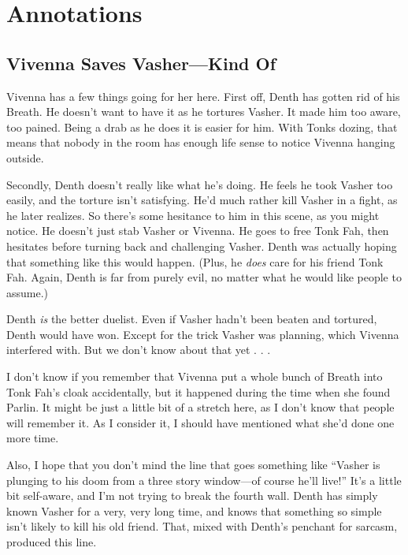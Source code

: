 \section*{Annotations}

\subsection*{Vivenna Saves Vasher—Kind Of}

Vivenna has a few things going for her here. First off, Denth has gotten rid of his Breath. He doesn’t want to have it as he tortures Vasher. It made him too aware, too pained. Being a drab as he does it is easier for him. With Tonks dozing, that means that nobody in the room has enough life sense to notice Vivenna hanging outside.

Secondly, Denth doesn’t really like what he’s doing. He feels he took Vasher too easily, and the torture isn’t satisfying. He’d much rather kill Vasher in a fight, as he later realizes. So there’s some hesitance to him in this scene, as you might notice. He doesn’t just stab Vasher or Vivenna. He goes to free Tonk Fah, then hesitates before turning back and challenging Vasher. Denth was actually hoping that something like this would happen. (Plus, he \textit{does} care for his friend Tonk Fah. Again, Denth is far from purely evil, no matter what he would like people to assume.)

Denth \textit{is} the better duelist. Even if Vasher hadn’t been beaten and tortured, Denth would have won. Except for the trick Vasher was planning, which Vivenna interfered with. But we don’t know about that yet . . .

I don’t know if you remember that Vivenna put a whole bunch of Breath into Tonk Fah’s cloak accidentally, but it happened during the time when she found Parlin. It might be just a little bit of a stretch here, as I don’t know that people will remember it. As I consider it, I should have mentioned what she’d done one more time.

Also, I hope that you don’t mind the line that goes something like “Vasher is plunging to his doom from a three story window—of course he’ll live!” It’s a little bit self-aware, and I’m not trying to break the fourth wall. Denth has simply known Vasher for a very, very long time, and knows that something so simple isn’t likely to kill his old friend. That, mixed with Denth’s penchant for sarcasm, produced this line.

